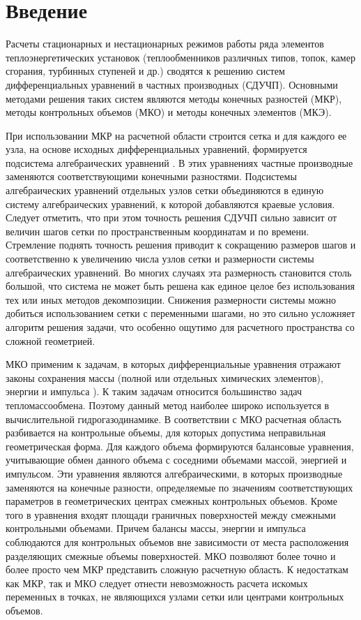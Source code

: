\documentclass[a4paper,11pt,numreferences,mathsec,kaplist]{isuepsutf8}
\begin{document}
\begin{article}
\begin{opening}
\end{opening}

\section{Введение} 

Расчеты стационарных и нестационарных режимов работы ряда элементов
теплоэнергетических установок (теплообменников различных типов, топок,
камер сгорания, турбинных ступеней и др.) сводятся к решению систем
дифференциальных уравнений в частных производных (СДУЧП). Основными
методами решения таких систем являются методы конечных разностей (МКР),
методы контрольных объемов (МКО) и методы конечных элементов (МКЭ).  

При использовании МКР на расчетной области строится сетка и для
каждого ее узла, на основе исходных дифференциальных уравнений,
формируется подсистема алгебраических уравнений
\cite{SN1978,C2020,S1985,KD2018}. В этих уравнениях частные
производные заменяются соответствующими конечными разностями.
Подсистемы алгебраических уравнений отдельных узлов сетки объединяются
в единую систему алгебраических уравнений, к которой добавляются
краевые условия. Следует отметить, что при этом точность решения СДУЧП
сильно зависит от величин шагов сетки по пространственным координатам
и по времени. Стремление поднять точность решения приводит к
сокращению размеров шагов и соответственно к увеличению числа узлов
сетки и размерности системы алгебраических уравнений. Во многих
случаях эта размерность становится столь большой, что система не может
быть решена как единое целое без использования тех или иных методов
декомпозиции.  Снижения размерности системы можно добиться
использованием сетки с переменными шагами, но это сильно усложняет
алгоритм решения задачи, что особенно ощутимо для расчетного
пространства со сложной геометрией.

МКО применим к задачам, в которых дифференциальные уравнения отражают
законы сохранения массы (полной или отдельных химических элементов),
энергии и импульса \cite{C2020,KD2018,PS1968}). К таким задачам
относится большинство задач тепломассообмена.  Поэтому данный метод
наиболее широко используется в вычислительной гидрогазодинамике. В
соответствии с МКО расчетная область разбивается на контрольные
объемы, для которых допустима неправильная геометрическая форма.  Для
каждого объема формируются балансовые уравнения, учитывающие обмен
данного объема с соседними объемами массой, энергией и импульсом. Эти
уравнения являются алгебраическими, в которых производные заменяются
на конечные разности, определяемые по значениям соответствующих
параметров в геометрических центрах смежных контрольных объемов. Кроме
того в уравнения входят площади граничных поверхностей между смежными
контрольными объемами. Причем балансы массы, энергии и импульса
соблюдаются для контрольных объемов вне зависимости от места
расположения разделяющих смежные объемы поверхностей. МКО позволяют
более точно и более просто чем МКР представить сложную расчетную
область.  К недостаткам как МКР, так и МКО следует отнести
невозможность расчета искомых переменных в точках, не являющихся
узлами сетки или центрами контрольных объемов.


\end{article}
\end{document}
